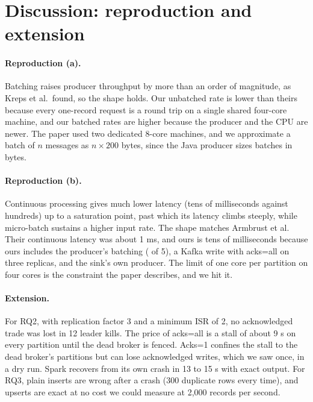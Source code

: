 \section{Discussion: reproduction and extension}
\paragraph{Reproduction (a).} Batching raises producer throughput by more than an order of magnitude,
as Kreps et al.\ found, so the shape holds. Our unbatched rate is lower than theirs because every
one-record request is a round trip on a single shared four-core machine, and our batched rates are
higher because the producer and the CPU are newer. The paper used two dedicated 8-core machines, and we
approximate a batch of $n$ messages as $n \times 200$ bytes, since the Java producer sizes batches in bytes.

\paragraph{Reproduction (b).} Continuous processing gives much lower latency (tens of milliseconds
against hundreds) up to a saturation point, past which its latency climbs steeply, while micro-batch
sustains a higher input rate. The shape matches Armbrust et al. Their continuous latency was about
1 ms, and ours is tens of milliseconds because ours includes the producer's batching (
of 5), a Kafka write with acks=all on three replicas, and the sink's own producer. The limit of one
core per partition on four cores is the constraint the paper describes, and we hit it.

\paragraph{Extension.} For RQ2, with replication factor 3 and a minimum ISR of 2, no acknowledged trade
was lost in 12 leader kills. The price of acks=all is a stall of about 9 s on every partition until the
dead broker is fenced. Acks=1 confines the stall to the dead broker's partitions but can lose
acknowledged writes, which we saw once, in a dry run. Spark recovers from its own crash in 13 to 15 s
with exact output. For RQ3, plain inserts are wrong after a crash (300 duplicate rows every time), and upserts
are exact at no cost we could measure at 2,000 records per second.

